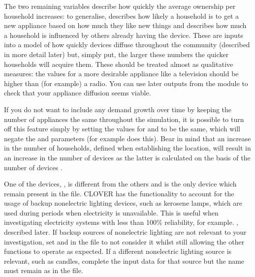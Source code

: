 \documentclass[letterpaper,10pt,english]{sphinxmanual}
\begin{document}
\sphinxAtStartPar
The two remaining variables describe how quickly the average ownership
per household increases: to generalise,  describes how
likely a household is to get a new appliance based on how much they like
new things and  describes how much a household is
influenced by others already having the device. These are inputs into a
model of how quickly devices diffuse throughout the community (described
in more detail later) but, simply put, the larger these numbers the
quicker households will acquire them. These should be treated almost as
qualitative measures: the values for a more desirable appliance like a
television should be higher than (for example) a radio. You can use
later outputs from the  module to check that your appliance
diffusion seems viable.

\sphinxAtStartPar
If you do not want to include any demand growth over time by keeping the
number of appliances the same throughout the simulation, it is possible
to turn off this feature simply by setting the values for 
and  to be the same, which will negate the  and
 parameters (for example  does this). Bear
in mind that an increase in the number of households, defined when
establishing the location, will result in an increase in the number of
devices as the latter is calculated on the basis of the number of
devices .

\sphinxAtStartPar
One of the devices, , is different from the others and is
the only device which  remain present in the  file.
CLOVER has the functionality to account for the usage of backup
non\sphinxhyphen{}electric lighting devices, such as kerosene lamps, which are used
during periods when electricity is unavailable. This is useful when
investigating electricity systems with less than 100\% reliability, for
example. , described later. If backup sources of non\sphinxhyphen{}electric lighting
are not relevant to your investigation, set  and
 in the  file to not consider it whilst still
allowing the other functions to operate as expected. If a different
non\sphinxhyphen{}electric lighting source is relevant, such as candles, complete the
input data for that source but the name must remain as  in
the  file.
\end{document}
